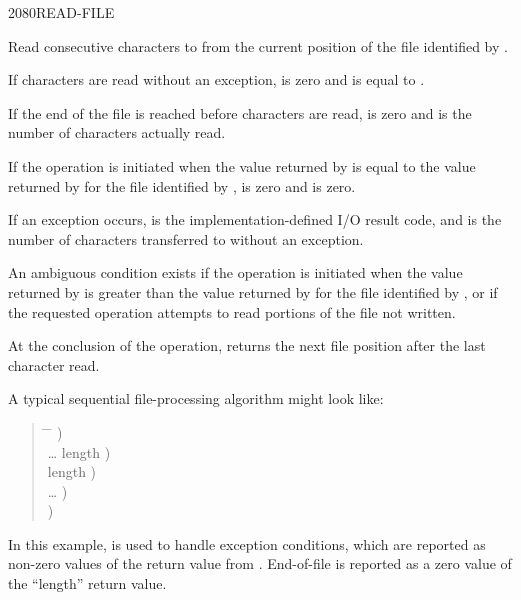 \vspace*{-7ex}\enlargethispage{8ex}
\begin{worddef}{2080}{READ-FILE}
\item {}

	Read  consecutive characters to  from the
	current position of the file identified by .

	If  characters are read without an exception, 
	is zero and  is equal to .

	If the end of the file is reached before  characters are
	read,  is zero and  is the number of characters
	actually read.

	If the operation is initiated when the value returned by
	 is equal to the value returned by
	 for the file identified by ,
	 is zero and  is zero.

	If an exception occurs,  is the implementation-defined
	I/O result code, and  is the number of characters
	transferred to  without an exception.

	An ambiguous condition exists if the operation is initiated when
	the value returned by  is greater than the
	value returned by  for the file identified by
	, or if the requested operation attempts to read
	portions of the file not written.

	At the conclusion of the operation,  returns
	the next file position after the last character read.

	\begin{rationale} %
		A typical sequential file-processing algorithm might look like:
		\begin{quote}\ttfamily{}
			\begin{tabbing}
			\tab \= \hspace{12em} \= \kill
								\>\>  ) \\
			\> {\ldots}  
											\>	  length ) \\
			 		\>\> \word{p} length ) \\
			\> {\ldots}						\>	  ) \\
								\>\>  )
			\end{tabbing}
		\end{quote}

		In this example,  is used to handle
		exception conditions, which are reported as
		non-zero values of the  return value from
		. End-of-file is reported as a zero value of
		the ``length'' return value.
	\end{rationale}
\end{worddef}


